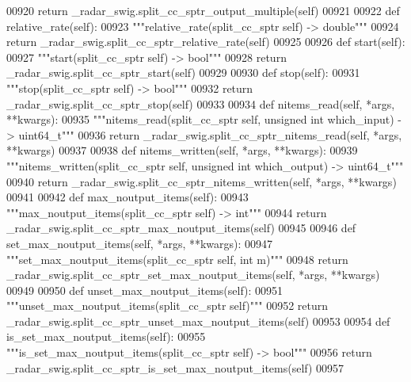 \begin{DoxyCode}
{{{{{00920         \textcolor{keywordflow}{return} \_radar\_swig.split\_cc\_sptr\_output\_multiple(self)
00921 
00922     \textcolor{keyword}{def }relative_rate(self):
00923         \textcolor{stringliteral}{"""relative\_rate(split\_cc\_sptr self) -> double"""}
00924         \textcolor{keywordflow}{return} \_radar\_swig.split\_cc\_sptr\_relative\_rate(self)
00925 
00926     \textcolor{keyword}{def }start(self):
00927         \textcolor{stringliteral}{"""start(split\_cc\_sptr self) -> bool"""}
00928         \textcolor{keywordflow}{return} \_radar\_swig.split\_cc\_sptr\_start(self)
00929 
00930     \textcolor{keyword}{def }stop(self):
00931         \textcolor{stringliteral}{"""stop(split\_cc\_sptr self) -> bool"""}
00932         \textcolor{keywordflow}{return} \_radar\_swig.split\_cc\_sptr\_stop(self)
00933 
00934     \textcolor{keyword}{def }nitems_read(self, *args, **kwargs):
00935         \textcolor{stringliteral}{"""nitems\_read(split\_cc\_sptr self, unsigned int which\_input) -> uint64\_t"""}
00936         \textcolor{keywordflow}{return} \_radar\_swig.split\_cc\_sptr\_nitems\_read(self, *args, **kwargs)
00937 
00938     \textcolor{keyword}{def }nitems_written(self, *args, **kwargs):
00939         \textcolor{stringliteral}{"""nitems\_written(split\_cc\_sptr self, unsigned int which\_output) -> uint64\_t"""}
00940         \textcolor{keywordflow}{return} \_radar\_swig.split\_cc\_sptr\_nitems\_written(self, *args, **kwargs)
00941 
00942     \textcolor{keyword}{def }max_noutput_items(self):
00943         \textcolor{stringliteral}{"""max\_noutput\_items(split\_cc\_sptr self) -> int"""}
00944         \textcolor{keywordflow}{return} \_radar\_swig.split\_cc\_sptr\_max\_noutput\_items(self)
00945 
00946     \textcolor{keyword}{def }set_max_noutput_items(self, *args, **kwargs):
00947         \textcolor{stringliteral}{"""set\_max\_noutput\_items(split\_cc\_sptr self, int m)"""}
00948         \textcolor{keywordflow}{return} \_radar\_swig.split\_cc\_sptr\_set\_max\_noutput\_items(self, *args, **kwargs)
00949 
00950     \textcolor{keyword}{def }unset_max_noutput_items(self):
00951         \textcolor{stringliteral}{"""unset\_max\_noutput\_items(split\_cc\_sptr self)"""}
00952         \textcolor{keywordflow}{return} \_radar\_swig.split\_cc\_sptr\_unset\_max\_noutput\_items(self)
00953 
00954     \textcolor{keyword}{def }is_set_max_noutput_items(self):
00955         \textcolor{stringliteral}{"""is\_set\_max\_noutput\_items(split\_cc\_sptr self) -> bool"""}
00956         \textcolor{keywordflow}{return} \_radar\_swig.split\_cc\_sptr\_is\_set\_max\_noutput\_items(self)
00957 
}}}}}
\end{DoxyCode}
